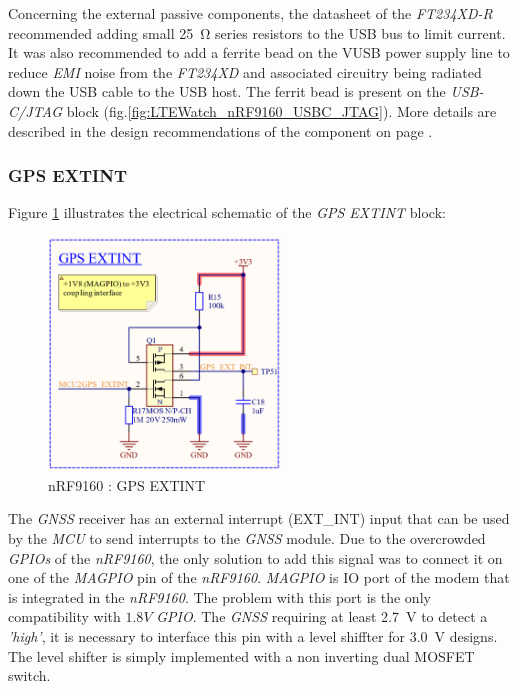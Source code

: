 \documentclass[report.tex]{subfiles}
\begin{document}
Concerning the external passive components, the datasheet of the \textit{FT234XD-R}\cite{FTDIUSB} recommended adding small \SI{25}{\ohm} series resistors to the USB bus to limit current. It was also recommended to add a ferrite bead on the VUSB power supply line to reduce \textit{EMI} noise from the \textit{FT234XD} and associated circuitry being radiated down the USB cable to the USB host. The ferrit bead is present on the \textit{USB-C/JTAG} block (fig.\ref{fig:LTEWatch_nRF9160_USBC_JTAG}). More details are described in the design recommendations of the component on page \pageref{sec:ftdi_sel}.

\subsubsection{GPS EXTINT}

Figure \ref{fig:LTEWatch_nRF9160_GPS_EXTINT} illustrates the electrical schematic of the \textit{GPS EXTINT} block:

\begin{figure}[H]
	\centering
	\includegraphics[width=0.55\textwidth]{Include/Figure/Hardware/LTEWatch_nRF9160_GPS_EXTINT}
	\caption{nRF9160 : GPS EXTINT}
	\label{fig:LTEWatch_nRF9160_GPS_EXTINT}
\end{figure}

The \textit{GNSS} receiver has an external interrupt (EXT\_INT) input that can be used by the \textit{MCU} to send interrupts to the \textit{GNSS} module. Due to the overcrowded \textit{GPIOs} of the \textit{nRF9160}, the only solution to add this signal was to connect it on one of the \textit{MAGPIO} pin of the \textit{nRF9160}. \textit{MAGPIO} is IO port of the modem that is integrated in the \textit{nRF9160}. The problem with this port is the only compatibility with $1.8V$ \textit{GPIO}. The \textit{GNSS} requiring at least \SI{2.7}{\volt} to detect a \textit{'high'}, it is necessary to interface this pin with a level shiffter for \SI{3.0}{\volt} designs. The level shifter is simply implemented with a non inverting dual MOSFET switch.
\end{document}
